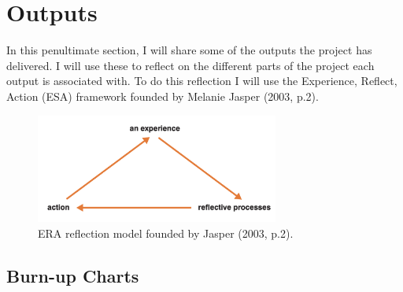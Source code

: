 \section{Outputs}
  In this penultimate section, I will share some of the outputs the project has delivered. I will use these to reflect on the different parts of the project
  each output is associated with. To do this reflection I will use the Experience, Reflect, Action (ESA) framework founded by Melanie Jasper (2003, p.2).

  \begin{figure}[H]
    \centering
    \includegraphics[width=8cm]{assets/eraReflection.png}
    \caption{ERA reflection model founded by Jasper (2003, p.2).}
    \label{fig:eraReflection}
  \end{figure}  

  \subsection{Burn-up Charts}
  \label{sec:burnup}

